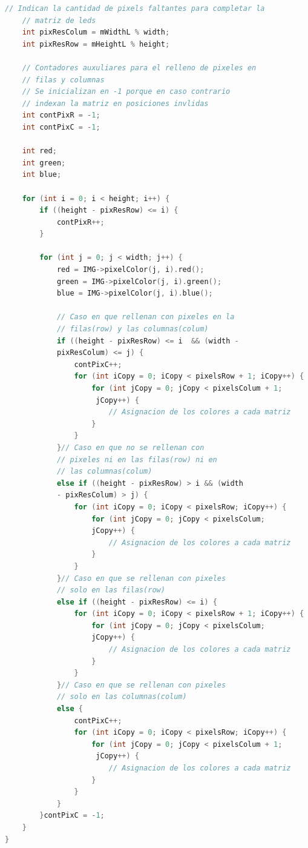 \documentclass{article}
\begin{document}
\begin{lstlisting}[language=C++, label=codigo_matrices_int]
    // Indican la cantidad de pixels faltantes para completar la 
    // matriz de leds
    int pixResColum = mWidthL % width;
    int pixResRow = mHeightL % height;

    // Contadores auxuliares para el relleno de pixeles en 
    // filas y columnas
    // Se inicializan en -1 porque en caso contrario
    // indexan la matriz en posiciones invlidas
    int contPixR = -1;
    int contPixC = -1;

    int red;
    int green;
    int blue;

    for (int i = 0; i < height; i++) {
        if ((height - pixResRow) <= i) {
            contPixR++;
        }

        for (int j = 0; j < width; j++) {
            red = IMG->pixelColor(j, i).red();
            green = IMG->pixelColor(j, i).green();
            blue = IMG->pixelColor(j, i).blue();

            // Caso en que rellenan con pixeles en la
            // filas(row) y las columnas(colum)
            if ((height - pixResRow) <= i  && (width - 
            pixResColum) <= j) {
                contPixC++;
                for (int iCopy = 0; iCopy < pixelsRow + 1; iCopy++) {
                    for (int jCopy = 0; jCopy < pixelsColum + 1;
                     jCopy++) {
                        // Asignacion de los colores a cada matriz
                    }
                }
            }// Caso en que no se rellenan con 
            // pixeles ni en las filas(row) ni en 
            // las columnas(colum)
            else if ((height - pixResRow) > i && (width 
            - pixResColum) > j) {
                for (int iCopy = 0; iCopy < pixelsRow; iCopy++) {
                    for (int jCopy = 0; jCopy < pixelsColum; 
                    jCopy++) {
                        // Asignacion de los colores a cada matriz
                    }
                }
            }// Caso en que se rellenan con pixeles 
            // solo en las filas(row)
            else if ((height - pixResRow) <= i) {
                for (int iCopy = 0; iCopy < pixelsRow + 1; iCopy++) {
                    for (int jCopy = 0; jCopy < pixelsColum; 
                    jCopy++) {
                        // Asignacion de los colores a cada matriz
                    }
                }
            }// Caso en que se rellenan con pixeles 
            // solo en las columnas(colum)
            else {
                contPixC++;
                for (int iCopy = 0; iCopy < pixelsRow; iCopy++) {
                    for (int jCopy = 0; jCopy < pixelsColum + 1;
                     jCopy++) {
                        // Asignacion de los colores a cada matriz
                    }
                }
            }
        }contPixC = -1;
    }
}


\end{lstlisting}
\end{document}

